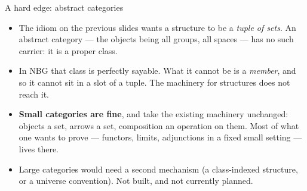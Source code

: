\documentclass[11pt,aspectratio=169]{beamer}
\begin{document}
\begin{frame}{A hard edge: abstract categories}
  \begin{itemize}
    \item The idiom on the previous slides wants a structure to be a
          \emph{tuple of sets}. An abstract category --- the objects being all
          groups, all spaces --- has no such carrier: it is a proper class.
    \item In NBG that class is perfectly sayable. What it cannot be is a
          \emph{member}, and so it cannot sit in a slot of a tuple. The
          machinery for structures does not reach it.
    \item \textbf{Small categories are fine}, and take the existing machinery
          unchanged: objects a set, arrows a set, composition an operation on
          them. Most of what one wants to prove --- functors, limits,
          adjunctions in a fixed small setting --- lives there.
    \item Large categories would need a second mechanism (a
          class-indexed structure, or a universe convention). Not built, and
          not currently planned.
  \end{itemize}
\end{frame}
\end{document}
